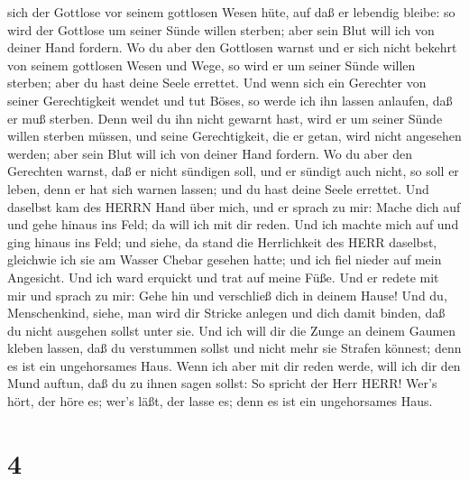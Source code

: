 sich der Gottlose vor seinem gottlosen Wesen hüte, auf daß er lebendig
bleibe: so wird der Gottlose um seiner Sünde willen sterben; aber sein
Blut will ich von deiner Hand fordern.  Wo du aber den
Gottlosen warnst und er sich nicht bekehrt von seinem gottlosen Wesen
und Wege, so wird er um seiner Sünde willen sterben; aber du hast deine
Seele errettet.  Und wenn sich ein Gerechter von seiner
Gerechtigkeit wendet und tut Böses, so werde ich ihn lassen anlaufen,
daß er muß sterben. Denn weil du ihn nicht gewarnt hast, wird er um
seiner Sünde willen sterben müssen, und seine Gerechtigkeit, die er
getan, wird nicht angesehen werden; aber sein Blut will ich von deiner
Hand fordern.  Wo du aber den Gerechten warnst, daß er
nicht sündigen soll, und er sündigt auch nicht, so soll er leben, denn
er hat sich warnen lassen; und du hast deine Seele errettet.
 Und daselbst kam des HERRN Hand über mich, und er sprach
zu mir: Mache dich auf und gehe hinaus ins Feld; da will ich mit dir
reden.  Und ich machte mich auf und ging hinaus ins Feld;
und siehe, da stand die Herrlichkeit des HERR daselbst, gleichwie ich
sie am Wasser Chebar gesehen hatte; und ich fiel nieder auf mein
Angesicht.  Und ich ward erquickt und trat auf meine Füße.
Und er redete mit mir und sprach zu mir: Gehe hin und verschließ dich in
deinem Hause!  Und du, Menschenkind, siehe, man wird dir
Stricke anlegen und dich damit binden, daß du nicht ausgehen sollst
unter sie.  Und ich will dir die Zunge an deinem Gaumen
kleben lassen, daß du verstummen sollst und nicht mehr sie Strafen
könnest; denn es ist ein ungehorsames Haus.  Wenn ich aber
mit dir reden werde, will ich dir den Mund auftun, daß du zu ihnen sagen
sollst: So spricht der Herr HERR! Wer's hört, der höre es; wer's läßt,
der lasse es; denn es ist ein ungehorsames Haus.

\hypertarget{section-3}{%
\section{4}\label{section-3}}

